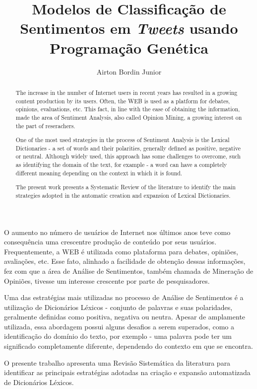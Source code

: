\documentclass[12pt]{article}
\title{Modelos de Classificação de Sentimentos em \emph{Tweets} usando Programação Genética}
\author{Airton Bordin Junior\inst{1}}
\begin{document}
 

\maketitle

\begin{abstract}
The increase in the number of Internet users in recent years has resulted in a growing content production by its users. Often, the WEB is used as a platform for debates, opinions, evaluations, etc. This fact, in line with the ease of obtaining the information, made the area of Sentiment Analysis, also called Opinion Mining, a growing interest on the part of reserachers.

One of the most used strategies in the process of Sentiment Analysis is the Lexical Dictionaries - a set of words and their polarities, generally defined as positive, negative or neutral. Although widely used, this approach has some challenges to overcome, such as identifying the domain of the text, for example - a word can have a completely different meaning depending on the context in which it is found.

The present work presents a Systematic Review of the literature to identify the main strategies adopted in the automatic creation and expansion of Lexical Dictionaries.
\end{abstract}

\begin{resumo} 
O aumento no número de usuários de Internet nos últimos anos teve como consequência uma crescentre produção de conteúdo por seus usuários. Frequentemente, a WEB é utilizada como plataforma para debates, opiniões, avaliações, etc. Esse fato, alinhado a facilidade de obtenção dessas informações, fez com que a área de Análise de Sentimentos, também chamada de Mineração de Opiniões, tivesse um interesse crescente por parte de pesquisadores. 

Uma das estratégias mais utilizadas no processo de Análise de Sentimentos é a utilização de Dicionários Léxicos  - conjunto de palavras e suas polaridades, geralmente definidas como positiva, negativa ou neutra. Apesar de amplamente utilizada, essa abordagem possui alguns desafios a serem superados, como a identificação do domínio do texto, por exemplo - uma palavra pode ter um significado completamente diferente, dependendo do contexto em que se encontra.

O presente trabalho apresenta uma Revisão Sistemática da literatura para identificar as principais estratégias adotadas na criação e expansão automatizada de Dicionários Léxicos.
\end{resumo}
\end{document}
